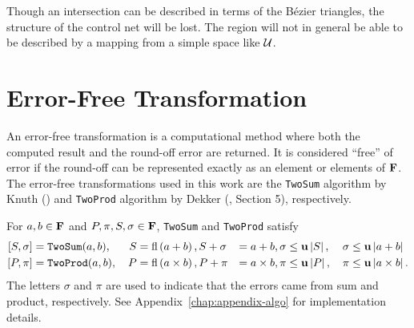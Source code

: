 Though an intersection can be described in terms of the B\'{e}zier triangles,
the structure of the control net will be lost. The region will not in general
be able to be described by a mapping from a simple space like
\(\mathcal{U}\).

\section{Error-Free Transformation}

An error-free transformation is a computational method where both
the computed result and the round-off error are returned. It
is considered ``free'' of error if the round-off can be represented
exactly as an element or elements of \(\mathbf{F}\).
The error-free transformations used in this work are
the \texttt{TwoSum} algorithm by Knuth (\cite{Knuth1997}) and
\texttt{TwoProd} algorithm by Dekker (\cite{Dekker1971}, Section 5),
respectively.

\begin{theorem}\label{thm:eft}
For \(a, b \in \mathbf{F}\) and \(P, \pi, S, \sigma \in \mathbf{F}\),
\texttt{TwoSum} and \texttt{TwoProd} satisfy
\begin{alignat}{4}
\left[S, \sigma\right] &= \mathtt{TwoSum}(a, b), & \, S &= \operatorname{fl}\left(a + b\right),
  S + \sigma &= a + b, \sigma &\leq \mathbf{u} \left|S\right|,
  & \, \sigma &\leq \mathbf{u} \left|a + b\right| \\
\left[P, \pi\right] &= \mathtt{TwoProd}(a, b),
  & \, P &= \operatorname{fl}\left(a \times b\right), P + \pi &= a \times b,
  \pi &\leq \mathbf{u} \left|P\right|,
  & \, \pi &\leq \mathbf{u} \left|a \times b\right|.
\end{alignat}
The letters \(\sigma\) and \(\pi\) are used to indicate that the
errors came from sum and product, respectively. See
Appendix~\ref{chap:appendix-algo} for implementation details.
\end{theorem}
